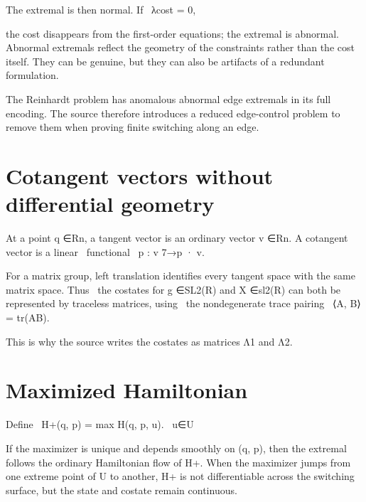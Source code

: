 \begin{displaytext}
The extremal is then normal. If \
λcost = 0,
\end{displaytext}

the cost disappears from the first-order equations; the extremal is abnormal. Abnormal extremals reflect the geometry of the constraints rather than the cost itself. They can be genuine, but they can also be artifacts of a redundant formulation.


The Reinhardt problem has anomalous abnormal edge extremals in its full encoding. The source therefore introduces a reduced edge-control problem to remove them when proving finite switching along an edge.


\section{Cotangent vectors without differential geometry}

\begin{displaytext}
At a point q ∈Rn, a tangent vector is an ordinary vector v ∈Rn. A cotangent vector is a linear \
functional \
p : v 7→p · v.
\end{displaytext}

\begin{displaytext}
For a matrix group, left translation identifies every tangent space with the same matrix space. Thus \
the costates for g ∈SL2(R) and X ∈sl2(R) can both be represented by traceless matrices, using \
the nondegenerate trace pairing \
⟨A, B⟩= tr(AB).
\end{displaytext}

\begin{displaytext}
This is why the source writes the costates as matrices Λ1 and Λ2.
\end{displaytext}

\section{Maximized Hamiltonian}

\begin{displaytext}
Define \
H+(q, p) = max H(q, p, u). \
u∈U
\end{displaytext}

If the maximizer is unique and depends smoothly on (q, p), then the extremal follows the ordinary Hamiltonian flow of H+. When the maximizer jumps from one extreme point of U to another, H+ is not differentiable across the switching surface, but the state and costate remain continuous.


